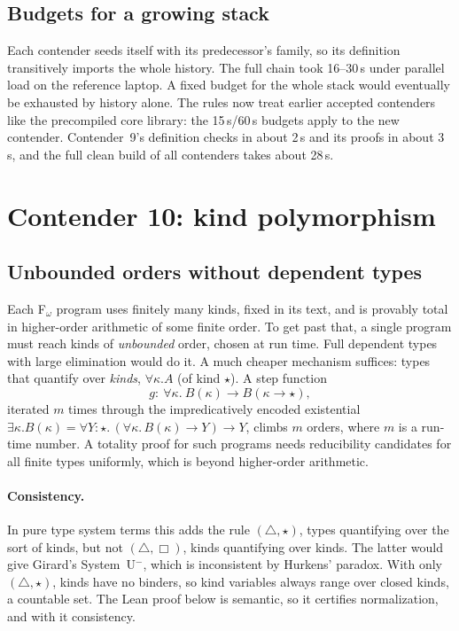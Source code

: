 \documentclass[11pt]{article}
\theoremstyle{definition}
\theoremstyle{remark}
\begin{document}
\subsection{Budgets for a growing stack}
Each contender seeds itself with its predecessor's family, so its definition
transitively imports the whole history. The full chain took 16--30\,s under
parallel load on the reference laptop. A fixed budget for the whole stack would
eventually be exhausted by history alone. The rules now treat earlier accepted
contenders like the precompiled core library: the 15\,s/60\,s budgets apply to
the new contender. Contender~9's definition checks in about 2\,s and its proofs
in about 3\,s, and the full clean build of all contenders takes about 28\,s.

\section{Contender 10: kind polymorphism}

\subsection{Unbounded orders without dependent types}
Each F$_\omega$ program uses finitely many kinds, fixed in its text, and is
provably total in higher-order arithmetic of some finite order. To get past
that, a single program must reach kinds of \emph{unbounded} order, chosen at
run time. Full dependent types with large elimination would do it. A much
cheaper mechanism suffices: types that quantify over \emph{kinds},
$\forall\kappa.A$ (of kind $\star$). A step function
\[g:\ \forall\kappa.\ B(\kappa)\to B(\kappa\to\star),\]
iterated $m$ times through the impredicatively encoded existential
$\exists\kappa.B(\kappa)=\forall Y{:}\star.\,(\forall\kappa.\,B(\kappa)\to Y)\to Y$,
climbs $m$ orders, where $m$ is a run-time number. A totality proof for such
programs needs reducibility candidates for all finite types uniformly, which is
beyond higher-order arithmetic.

\paragraph{Consistency.} In pure type system terms this adds the rule
$(\triangle,\star)$, types quantifying over the sort of kinds, but not
$(\triangle,\Box)$, kinds quantifying over kinds. The latter would give
Girard's System~U$^-$, which is inconsistent by Hurkens' paradox. With only
$(\triangle,\star)$, kinds have no binders, so kind variables always range over
closed kinds, a countable set. The Lean proof below is semantic, so it
certifies normalization, and with it consistency.
\end{document}
